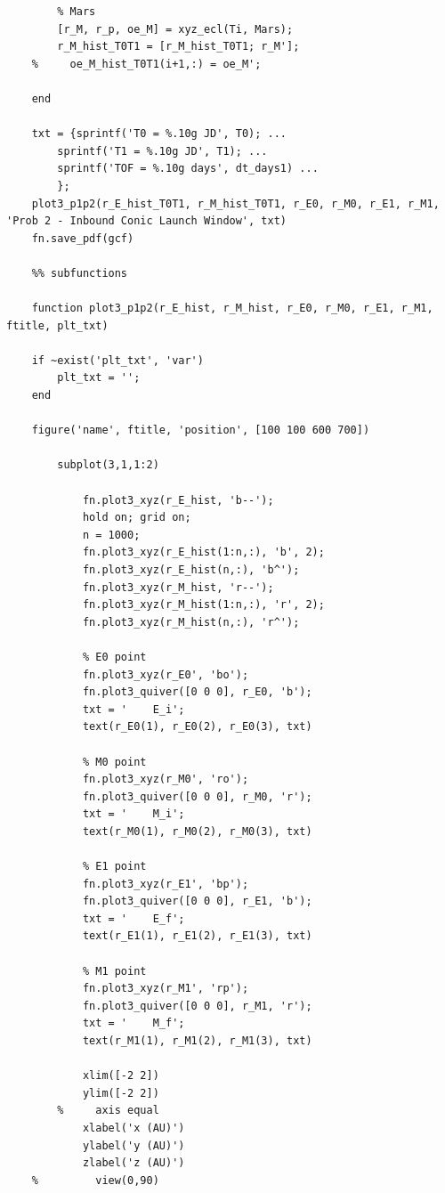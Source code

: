 \documentclass[conf]{new-aiaa}
\begin{document}
\begin{lstlisting}
        % Mars 
        [r_M, r_p, oe_M] = xyz_ecl(Ti, Mars); 
        r_M_hist_T0T1 = [r_M_hist_T0T1; r_M']; 
    %     oe_M_hist_T0T1(i+1,:) = oe_M'; 
        
    end 
    
    txt = {sprintf('T0 = %.10g JD', T0); ... 
        sprintf('T1 = %.10g JD', T1); ... 
        sprintf('TOF = %.10g days', dt_days1) ... 
        }; 
    plot3_p1p2(r_E_hist_T0T1, r_M_hist_T0T1, r_E0, r_M0, r_E1, r_M1, 'Prob 2 - Inbound Conic Launch Window', txt)
    fn.save_pdf(gcf)
    
    %% subfunctions 
    
    function plot3_p1p2(r_E_hist, r_M_hist, r_E0, r_M0, r_E1, r_M1, ftitle, plt_txt)
    
    if ~exist('plt_txt', 'var')
        plt_txt = ''; 
    end 
    
    figure('name', ftitle, 'position', [100 100 600 700])
    
        subplot(3,1,1:2)
    
            fn.plot3_xyz(r_E_hist, 'b--'); 
            hold on; grid on; 
            n = 1000; 
            fn.plot3_xyz(r_E_hist(1:n,:), 'b', 2); 
            fn.plot3_xyz(r_E_hist(n,:), 'b^'); 
            fn.plot3_xyz(r_M_hist, 'r--'); 
            fn.plot3_xyz(r_M_hist(1:n,:), 'r', 2); 
            fn.plot3_xyz(r_M_hist(n,:), 'r^'); 
    
            % E0 point 
            fn.plot3_xyz(r_E0', 'bo'); 
            fn.plot3_quiver([0 0 0], r_E0, 'b'); 
            txt = '    E_i'; 
            text(r_E0(1), r_E0(2), r_E0(3), txt)
    
            % M0 point 
            fn.plot3_xyz(r_M0', 'ro'); 
            fn.plot3_quiver([0 0 0], r_M0, 'r'); 
            txt = '    M_i'; 
            text(r_M0(1), r_M0(2), r_M0(3), txt)
    
            % E1 point 
            fn.plot3_xyz(r_E1', 'bp'); 
            fn.plot3_quiver([0 0 0], r_E1, 'b'); 
            txt = '    E_f'; 
            text(r_E1(1), r_E1(2), r_E1(3), txt)
    
            % M1 point 
            fn.plot3_xyz(r_M1', 'rp'); 
            fn.plot3_quiver([0 0 0], r_M1, 'r'); 
            txt = '    M_f'; 
            text(r_M1(1), r_M1(2), r_M1(3), txt)
    
            xlim([-2 2])
            ylim([-2 2])
        %     axis equal 
            xlabel('x (AU)') 
            ylabel('y (AU)') 
            zlabel('z (AU)') 
    %         view(0,90)
            

\end{lstlisting}
\end{document}
